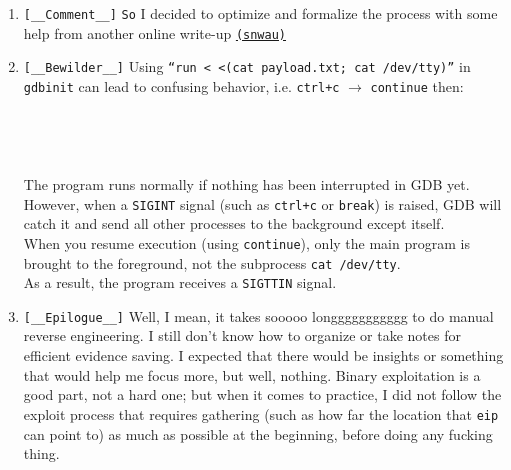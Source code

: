 \documentclass[main.tex]{subfiles}
\begin{document}
\hfill
\begin{minipage}[t]{0.49\textwidth}
	\begin{enumerate}
		\setlength{\parskip}{1em}
		\item[\texttt{[\_]}] \texttt{[\_\_Comment\_\_]} \texttt{So} I decided to optimize and formalize the process with some help from another online write-up \href{https://github.com/snwau/picoCTF-2024-Writeup/blob/main/Binary%20Exploitation/babygame03/babygame03.md}{\texttt{(snwau)}}
		\item[\texttt{[\_]}] \texttt{[\_\_Bewilder\_\_]} Using \texttt{``run < <(cat payload.txt; cat /dev/tty)''} in \texttt{gdbinit} can lead to confusing behavior, i.e. \texttt{ctrl+c} $\rightarrow$ \texttt{continue} then:\\[0.3em]
		\\\\
		\\\\
		The program runs normally if nothing has been interrupted in GDB yet.\\[0.3em]
		However, when a \texttt{SIGINT} signal (such as \texttt{ctrl+c} or \texttt{break}) is raised, GDB will catch it and send all other processes to the background except itself.\\[0.3em]
		When you resume execution (using \texttt{continue}), only the main program is brought to the foreground, not the subprocess \texttt{cat /dev/tty}.\\[0.3em]
		As a result, the program receives a \texttt{SIGTTIN} signal.
		\item[\texttt{[\_]}] \texttt{[\_\_Epilogue\_\_]} Well, I mean, it takes sooooo longgggggggggg to do manual reverse engineering. I still don’t know how to organize or take notes for efficient evidence saving. I expected that there would be insights or something that would help me focus more, but well, nothing. Binary exploitation is a good part, not a hard one; but when it comes to practice, I did not follow the exploit process that requires gathering (such as how far the location that \texttt{eip} can point to) as much as possible at the beginning, before doing any fucking thing.
	\end{enumerate}
	
	\setlength{\parskip}{0.4em}
	\userline
	

\end{minipage}
\end{document}
